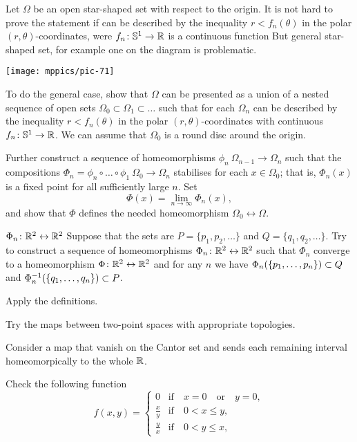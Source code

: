 \begin{multicols}{2}
Let $\Omega$ be an open star-shaped set with respect to the origin.
It is not hard to prove the statement if can be described by the inequality $r<f_n(\theta)$ in the polar $(r,\theta)$-coordinates, were $f_n\colon\mathbb{S}^1\to \mathbb{R}$ is a continuous function
But general star-shaped set, for example one on the diagram is problematic.

\begin{Figure}
\vskip-0mm
\centering
\texttt{[image: mppics/pic-71]}
\end{Figure}

To do the general case,
show that $\Omega$ can be presented as a union of a nested sequence of open sets $\Omega_0\subset \Omega_1\subset \dots$
such that for each $\Omega_n$ can be described by the inequality $r<f_n(\theta)$ in the polar $(r,\theta)$-coordinates with continuous $f_n\colon\mathbb{S}^1\to \mathbb{R}$.
We can assume that $\Omega_0$ is a round disc around the origin.

Further construct a sequence of homeomorphisms $\phi_n\:\Omega_{n-1}\to\Omega_{n}$ such that 
the compositions $\Phi_n=\phi_n\circ\dots\circ\phi_1\:\Omega_0\to \Omega_n$ stabilises for each $x\in\Omega_0$; that is, $\Phi_n(x)$ is a fixed point for all sufficiently large $n$.
Set 
\[\Phi(x)=\lim_{n\to\infty} \Phi_n(x),\]
and show that $\Phi$ defines the needed homeomorphism $\Omega_0\leftrightarrow \Omega$.

$\Phi_n\colon\mathbb{R}^2\leftrightarrow\mathbb{R}^2$
Suppose that the sets are $P=\{p_1,p_2,\dots \}$ and $Q=\{q_1,q_2,\dots\}$.
Try to construct a sequence of homeomorphisms $\Phi_n\colon\mathbb{R}^2\leftrightarrow\mathbb{R}^2$ such that 
$\Phi_n$ converge to a homeomorphism $\Phi\colon\mathbb{R}^2\leftrightarrow\mathbb{R}^2$ and for any $n$ we have $\Phi_n(\{p_1,\dots,p_n\})\z\subset Q$ and $\Phi_n^{-1}(\{q_1,\dots,q_n\})\z\subset P$.

Apply the definitions.

Try the maps between two-point spaces with appropriate topologies.

Consider a map that vanish on the Cantor set and sends each remaining interval homeomorpically to the whole $\mathbb{R}$.

Check the following function
\[f(x,y)=
\begin{cases}
0&\text{if}\quad x=0\quad\text{or}\quad y=0,
\\
\tfrac xy &\text{if}\quad 0<x\le y,
\\
\tfrac yx &\text{if}\quad 0<y\le x,
\end{cases}
\]


\end{multicols}
